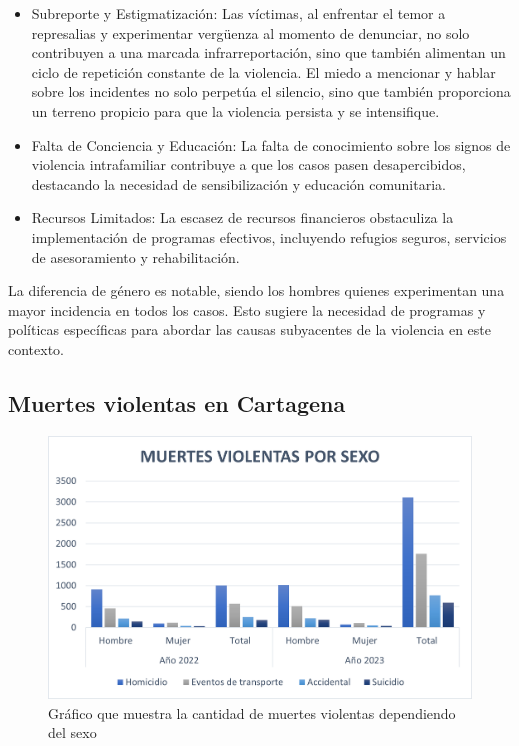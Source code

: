 \documentclass[letterpaper, 12pt]{article}
\begin{document}
\begin{itemize}
    \item Subreporte y Estigmatización: Las víctimas, al enfrentar el
          temor a represalias y experimentar vergüenza al momento de
          denunciar, no solo contribuyen a una marcada
          infrarreportación, sino que también alimentan un ciclo de
          repetición constante de la violencia. El miedo a mencionar
          y hablar sobre los incidentes no solo perpetúa el silencio,
          sino que también proporciona un terreno propicio para que
          la violencia persista y se intensifique.

    \item Falta de Conciencia y Educación: La falta de conocimiento
          sobre los signos de violencia intrafamiliar contribuye a
          que los casos pasen desapercibidos, destacando la necesidad
          de sensibilización y educación comunitaria.

    \item Recursos Limitados: La escasez de recursos financieros
          obstaculiza la implementación de programas efectivos,
          incluyendo refugios seguros, servicios de asesoramiento y
          rehabilitación.
\end{itemize}

La diferencia de género es notable, siendo los hombres
quienes experimentan una mayor incidencia en todos los
casos. Esto sugiere la necesidad de programas y políticas
específicas para abordar las causas subyacentes de la
violencia en este contexto.


\subsection*{Muertes violentas en Cartagena}

\begin{figure}[H]
    \begin{center}
        \includegraphics[width=.8\linewidth]{./Images/Graph.MuertesViolentas.png}
        \caption{Gráfico que muestra la cantidad de muertes violentas dependiendo del sexo}
        \label{fig:Graph.MuertesViolentas}
    \end{center}
\end{figure}
\end{document}
